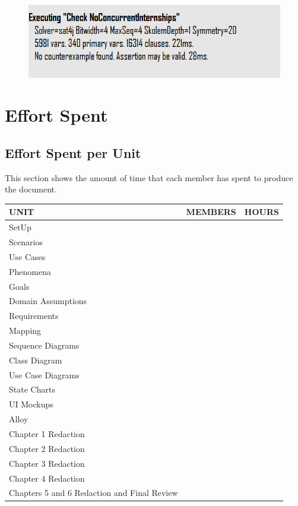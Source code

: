 \documentclass{article}
\begin{document}
\begin{figure}[H]
    \centering
    \includegraphics[width=1\textwidth]{figures/alloy/assertion.png}
    \centering
\end{figure}
\section{Effort Spent}
\subsection{Effort Spent per Unit}
This section shows the amount of time that each member has spent to produce the document. 

\begin{center}
    \begin{tabular}{|m{5cm}|m{5cm}|m{2cm}|}
        \hline
        \textbf{UNIT} & \textbf{MEMBERS} & \textbf{HOURS} \\ \hline
        SetUp &  &  \\ \hline
        Scenarios &  &  \\ \hline
        Use Cases &   &  \\ \hline
        Phenomena &   &  \\ \hline
        Goals &   & \\ \hline
        Domain Assumptions &  & \\ \hline
        Requirements & & \\ \hline
        Mapping &  & \\ \hline
        Sequence Diagrams &  & \\ \hline
        Class Diagram &  &  \\ \hline
        Use Case Diagrams &  & \\ \hline
        State Charts &  &  \\ \hline
        UI Mockups &  &  \\ \hline
        Alloy &  &  \\ \hline
        Chapter 1 Redaction &  &  \\ \hline
        Chapter 2 Redaction &  &  \\ \hline
        Chapter 3 Redaction &  &  \\ \hline
        Chapter 4 Redaction &  &  \\ \hline
        Chapters 5 and 6 Redaction and Final Review & & \\ \hline
    \end{tabular}
\end{center}
\end{document}

